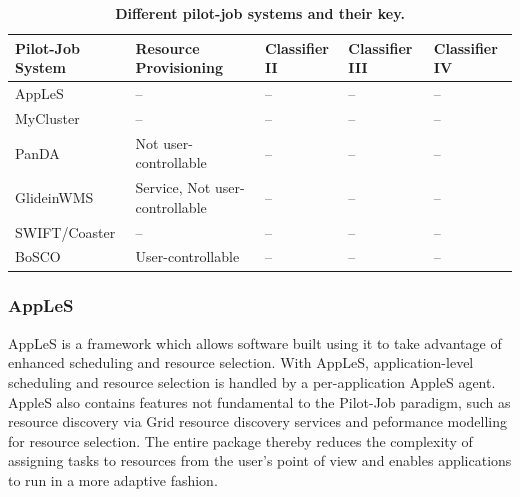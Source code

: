 \documentclass{sig-alternate}
\begin{document}


\begin{table}[t]
 \up
 \centering
 \begin{tabular}{|p{3cm}|p{3cm}|p{3cm}|p{3cm}|p{3cm}|}
  \hline
  \textbf{Pilot-Job System} &\textbf{Resource Provisioning} &\textbf{Classifier II} &\textbf{Classifier III} &\textbf{Classifier IV}  \\
  \hline
          AppLeS            & --                   & --                    & --                     & --                     \\ 
  \hline
          MyCluster         & --                   & --                    & --                     & --                     \\ 
  \hline
          PanDA             & Not user-controllable                   & --                    & --                     & --                     \\ 
  \hline
          GlideinWMS        & Service, Not user-controllable                    & --                    & --                     & --                     \\ 
  \hline
          SWIFT/Coaster     & --                   & --                    & --                     & --                     \\ 
 \hline
          BoSCO             & User-controllable                   & --                    & --                     & --                     \\ 
 \hline
 \end{tabular}
 \caption{\textbf{Different pilot-job systems and their key. 
 }
 \up} 
 \label{table:bigjob-saga-diane}
\end{table}


%
\subsubsection{AppLeS}
AppLeS is a framework which allows software built using it to take advantage
of enhanced scheduling and resource selection.
With AppLeS, application-level scheduling and resource selection is handled by a
per-application AppleS agent.
AppleS also contains features not fundamental to the Pilot-Job paradigm, such
as resource discovery via Grid resource discovery services and peformance
modelling for resource selection.  The entire package thereby reduces the
complexity of assigning tasks to resources from the user's point of view
and enables applications to run in a more adaptive fashion.
\end{document}
